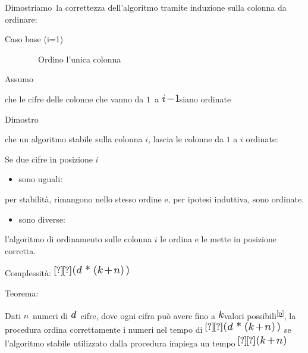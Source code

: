 \documentclass{article}
\providecommand{\tightlist}{%
  \setlength{\itemsep}{0pt}\setlength{\parskip}{0pt}}
\begin{document}
{{Dimostriamo}{~la correttezza dell'algoritmo tramite induzione sulla
colonna da ordinare:}

{Caso base (i=1)}

{~~~~~~~~Ordino l'unica colonna}

{Assumo}

{che le cifre delle colonne che vanno da
}$1${~a
}\includegraphics{images/image195.png}{siano ordinate}

{Dimostro }

{che un algoritmo stabile sulla colonna $i$, lascia le colonne da $1$ a $i$ ordinate:}

{Se due cifre in posizione $i$}

\begin{itemize}
\tightlist
\item
  {sono }{uguali}{: }
\end{itemize}

{per stabilità, rimangono nello stesso ordine e, per ipotesi induttiva, sono ordinate.}

\begin{itemize}
\tightlist
\item
  {sono }{diverse}{:}
\end{itemize}

{l'algoritmo di ordinamento sulle colonna $i$ le ordina e le mette in posizione corretta.}

{Complessità: }\includegraphics{images/image196.png}

{Teorema: }

{Dati }$n${~numeri di
}\includegraphics{images/image197.png}{~cifre, }{dove ogni cifra può
avere fino a }\includegraphics{images/image118.png}{valori
possibili}\textsuperscript{\protect\hyperlink{cmnt16}{{[}p{]}}}{, la
procedura ordina correttamente i numeri nel tempo di
}\includegraphics{images/image196.png}{~se l'algoritmo stabile
utilizzato dalla procedura impiega un tempo
}\includegraphics{images/image198.png}

}
\end{document}
